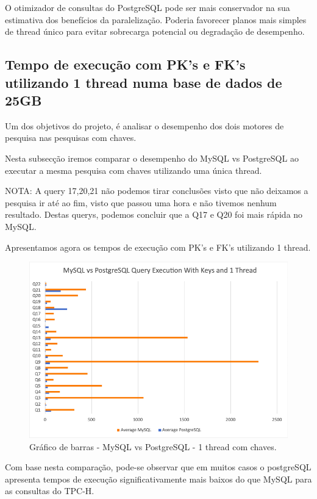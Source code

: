 \documentclass{article}
\begin{document}
  O otimizador de consultas do PostgreSQL pode ser mais conservador na sua estimativa dos benefícios da paralelização. Poderia favorecer planos mais simples de thread único para evitar sobrecarga potencial ou degradação de desempenho.






\clearpage
\subsection{Tempo de execução com PK's e FK's utilizando 1 thread numa base
de dados de 25GB}
\texttt{}\par Um dos objetivos do projeto, é analisar o desempenho dos dois motores de pesquisa nas pesquisas com chaves.

Nesta subsecção iremos comparar o desempenho do MySQL vs PostgreSQL ao executar a mesma pesquisa com chaves utilizando uma única thread.


NOTA: A query 17,20,21 não podemos tirar conclusões visto que não deixamos a pesquisa ir até ao fim, visto que passou uma hora e não tivemos nenhum resultado. Destas querys, podemos concluir que a Q17 e Q20 foi mais rápida no MySQL.


Apresentamos agora os tempos de execução com PK's e FK's utilizando 1 thread.
\begin{figure}[H]
  \centering
  \includegraphics[width=\textwidth]{Graphs/mysqlvspostgresql_withkeys_onethread.png}
  \caption{Gráfico de barras - MySQL vs PostgreSQL - 1 thread com chaves.}
  \label{fig:PKCreation2}
\end{figure}
\texttt{}\par Com base nesta comparação, pode-se observar que em muitos casos o postgreSQL apresenta tempos de execução significativamente mais baixos do que MySQL para as consultas do TPC-H.
\end{document}
